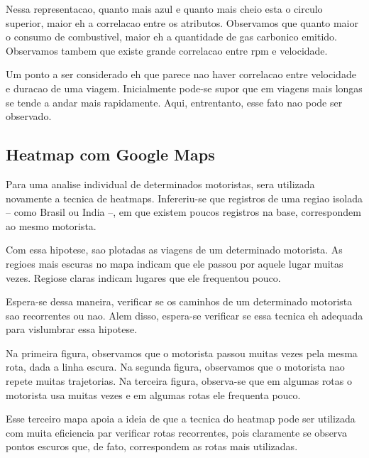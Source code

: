 \documentclass[10pt, conference]{IEEEtran}
\begin{document}
Nessa representacao, quanto mais azul e quanto mais cheio esta o circulo superior, maior
eh a correlacao entre os atributos. Observamos que quanto maior o consumo de combustivel,
maior eh a quantidade de gas carbonico emitido. Observamos tambem que existe grande
correlacao entre rpm e velocidade. 

Um ponto a ser considerado eh que parece nao haver correlacao entre velocidade e duracao
de uma viagem. Inicialmente pode-se supor que em viagens mais longas se tende a andar
mais rapidamente. Aqui, entrentanto, esse fato nao pode ser observado.



\subsection{Heatmap com Google Maps}

Para uma analise individual de determinados motoristas, sera utilizada novamente a tecnica de heatmaps.
Infereriu-se que registros de uma regiao isolada -- como Brasil ou India --, em que existem poucos
registros na base, correspondem ao mesmo motorista.

Com essa hipotese, sao plotadas as viagens de um determinado motorista. As regioes mais escuras no
mapa indicam que ele passou por aquele lugar muitas vezes. Regiose claras indicam lugares que ele
frequentou pouco. 

Espera-se dessa maneira, verificar se os caminhos de um determinado motorista sao recorrentes ou nao.
Alem disso, espera-se verificar se essa tecnica eh adequada para vislumbrar essa hipotese.

Na primeira figura, observamos que o motorista passou muitas vezes pela mesma rota, dada a linha escura.
Na segunda figura, observamos que o motorista nao repete muitas trajetorias. Na terceira figura, observa-se
que em algumas rotas o motorista usa muitas vezes e em algumas rotas ele frequenta pouco.

Esse terceiro mapa apoia a ideia de que a tecnica do heatmap pode ser utilizada com muita eficiencia par
verificar rotas recorrentes, pois claramente se observa pontos escuros que, de fato, correspondem as 
rotas mais utilizadas.


\end{document}
